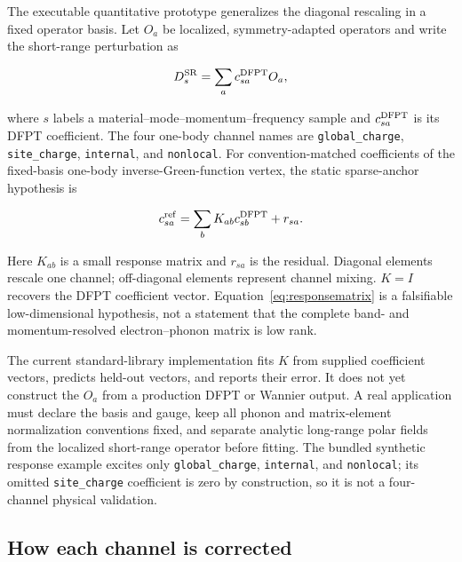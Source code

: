 The executable quantitative prototype generalizes the diagonal rescaling in a
fixed operator basis.  Let $O_a$ be localized, symmetry-adapted operators and
write the short-range perturbation as

\begin{equation}
  D^{\mathrm{SR}}_{s}=\sum_a c^{\mathrm{DFPT}}_{s a} O_a,
\end{equation}

where $s$ labels a material--mode--momentum--frequency sample and
$c^{\mathrm{DFPT}}_{s a}$ is its DFPT coefficient.  The four one-body channel names are
\texttt{global\_charge}, \texttt{site\_charge}, \texttt{internal}, and
\texttt{nonlocal}.  For convention-matched coefficients of the fixed-basis
one-body inverse-Green-function vertex, the static sparse-anchor hypothesis is

\begin{equation}
  c^{\mathrm{ref}}_{s a}
  =\sum_b K_{ab} c^{\mathrm{DFPT}}_{s b}+r_{s a}.
  \label{eq:responsematrix}
\end{equation}

Here $K_{ab}$ is a small response matrix and $r_{s a}$ is the residual.  Diagonal
elements rescale one channel; off-diagonal elements represent channel mixing.
$K=I$ recovers the DFPT coefficient vector.  Equation~\eqref{eq:responsematrix}
is a falsifiable low-dimensional hypothesis, not a statement that the complete
band- and momentum-resolved electron--phonon matrix is low rank.

The current standard-library implementation fits $K$ from supplied coefficient
vectors, predicts held-out vectors, and reports their error.  It does not yet
construct the $O_a$ from a production DFPT or Wannier output.  A real application
must declare the basis and gauge, keep all phonon and matrix-element normalization
conventions fixed, and separate analytic long-range polar fields from the
localized short-range operator before fitting.
The bundled synthetic response example excites only
\texttt{global\_charge}, \texttt{internal}, and \texttt{nonlocal}; its omitted
\texttt{site\_charge} coefficient is zero by construction, so it is not a
four-channel physical validation.

\subsection{How each channel is corrected}

